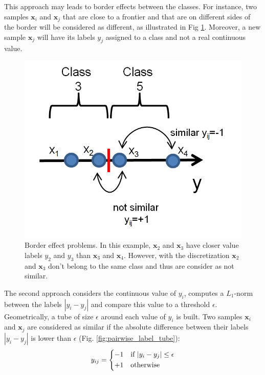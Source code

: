 \noindent This approach may leads to border effects between the classes. For instance, two samples $\textbf{x}_i$ and $\textbf{x}_j$ that are close to a frontier and that are on different sides of the border will be considered as different, as illustrated in Fig \ref{fig:Discretize_binning_border_effect}. Moreover, a new sample $\textbf{x}_j$ will have its labels $y_j$ assigned to a class and not a real continuous value. 

\begin{figure}[h!]
	\centering
	\includegraphics[width=0.42\linewidth]{images/Discretize_binning_border_effect}
	\caption{Border effect problems. In this example, $\textbf{x}_2$ and $\textbf{x}_3$ have closer value labels $y_2$ and $y_3$ than $\textbf{x}_3$ and $\textbf{x}_4$. However, with the discretization $\textbf{x}_2$ and $\textbf{x}_3$ don't belong to the same class and thus are consider as not similar.}
	\label{fig:Discretize_binning_border_effect}
\end{figure}

\noindent The second approach considers the continuous value of $y_i$, computes a $L_1$-norm between the labels $|y_i-y_j|$ and compare this value to a threshold $\epsilon$. Geometrically, a tube of size $\epsilon$ around each value of $y_i$ is built. Two samples $\textbf{x}_i$ and  $\textbf{x}_j$ are considered as similar if the absolute difference between their labels $|y_i-y_j|$ is lower than $\epsilon$ (Fig. \ref{fig:pairwise_label_tube}):
\begin{equation}
y_{ij} = 
\left\{
\begin{split}
\begin{aligned}
-1 & \text{\quad if } |y_i-y_j| \leq \epsilon \\ 
+1 & \text{\quad otherwise }
\end{aligned} 
\end{split}
\right.
\end{equation}

